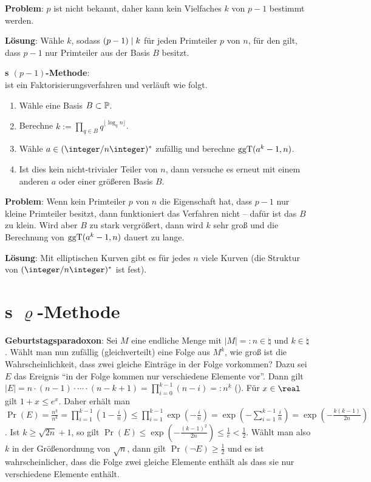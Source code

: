 \textbf{Problem}:
$p$ ist nicht bekannt, daher kann kein Vielfaches $k$ von $p - 1$ bestimmt werden.

\textbf{Lösung}:
Wähle $k$, sodass $(p - 1) \mid k$ für jeden Primteiler $p$ von $n$,
für den gilt, dass $p - 1$ nur Primteiler aus der Basis $B$ besitzt.

\linie

\textbf{s $(p-1)$-Methode}:\\
 ist ein Faktorisierungsverfahren und verläuft wie folgt.
\begin{enumerate}
    \item
    Wähle eine Basis $B \subset \mathbb{P}$.

    \item
    Berechne $k := \prod_{q \in B} q^{\lfloor \log_q n \rfloor}$.

    \item
    Wähle $a \in (\ZnZ)^\ast$ zufällig und berechne $\operatorname{ggT}(a^k - 1, n)$.

    \item
    Ist dies kein nicht-trivialer Teiler von $n$, dann versuche es erneut mit einem anderen
    $a$ oder einer größeren Basis $B$.
\end{enumerate}

\linie

\textbf{Problem}:
Wenn kein Primteiler $p$ von $n$ die Eigenschaft hat, dass $p - 1$ nur kleine Primteiler besitzt,
dann funktioniert das Verfahren nicht -- dafür ist das $B$ zu klein.
Wird aber $B$ zu stark vergrößert, dann wird $k$ sehr groß und die Berechnung von
$\operatorname{ggT}(a^k - 1, n)$ dauert zu lange.

\textbf{Lösung}:
Mit elliptischen Kurven gibt es für jedes $n$ viele Kurven
(die Struktur von $(\ZnZ)^\ast$ ist fest).

\pagebreak

\section{%
    s \texorpdfstring{$\varrho$}{ρ}-Methode%
}

\textbf{Geburtstagsparadoxon}:
Sei $M$ eine endliche Menge mit $|M| =: n \in \natural$ und $k \in \natural$.
Wählt man nun zufällig (gleichverteilt) eine Folge aus $M^k$,
wie groß ist die Wahrscheinlichkeit, dass zwei
gleiche Einträge in der Folge vorkommen?
Dazu sei $E$ das Ereignis "`in der Folge kommen nur verschiedene Elemente vor"'.
Dann gilt
$|E| = n \cdot (n - 1) \cdot \dotsb \cdot (n - k + 1) = \prod_{i=0}^{k-1} (n-i) =:
n^{\underline{k}}$
().
Für $x \in \real$ gilt $1 + x \le e^x$.
Daher erhält man\\
$\Pr(E) = \frac{n^{\underline{k}}}{n^k} = \prod_{i=1}^{k-1} (1 - \frac{i}{n})
\le \prod_{i=1}^{k-1} \exp(-\frac{i}{n}) = \exp(-\sum_{i=1}^{k-1} \frac{i}{n})
= \exp(-\frac{k(k-1)}{2n})$.
Ist $k \ge \sqrt{2n} + 1$, so gilt
$\Pr(E) \le \exp(-\frac{(k-1)^2}{2n}) \le \frac{1}{e} < \frac{1}{2}$.
Wählt man also $k$ in der Größenordnung von $\sqrt{n}$, dann gilt
$\Pr(\lnot E) \ge \frac{1}{2}$ und es ist wahrscheinlicher, dass die Folge zwei gleiche
Elemente enthält als dass sie nur verschiedene Elemente enthält.


